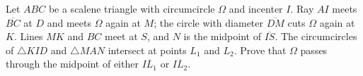 Let $ABC$ be a scalene triangle with circumcircle $\Omega$ and incenter $I$. Ray $AI$ meets $\overline{BC}$ at $D$ and meets $\Omega$ again at $M$; the circle with diameter $\overline{DM}$ cuts $\Omega$ again at $K$. Lines $MK$ and $BC$ meet at $S$,  and $N$ is the midpoint of $\overline{IS}$. The circumcircles of $\triangle KID$ and $\triangle MAN$ intersect at points $L_1$ and $L_2$. Prove that $\Omega$ passes through the midpoint of either $\overline{IL_1}$ or $\overline{IL_2}$.